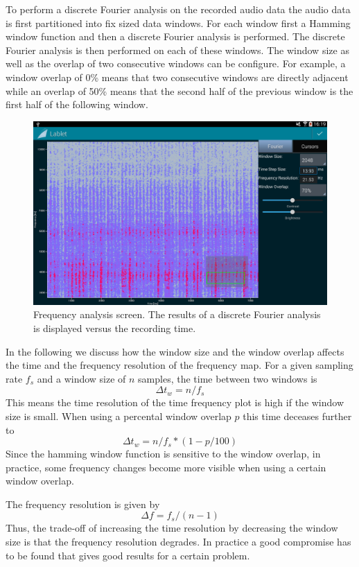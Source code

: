 \documentclass{sigchi}
\begin{document}
To perform a discrete Fourier analysis on the recorded audio data the audio data is first partitioned into fix sized data windows.
For each window first a Hamming window function and then a discrete Fourier analysis is performed.
The discrete Fourier analysis is then performed on each of these windows.
The window size as well as the overlap of two consecutive windows can be configure.
For example, a window overlap of 0\% means that two consecutive windows are directly adjacent while an overlap of 50\% means that the second half of the previous window is the first half of the following window.

\begin{figure}
  \centering
  \includegraphics[width=.99\columnwidth]{FrequencyAnalysis}
  \caption{Frequency analysis screen.
  The results of a discrete Fourier analysis is displayed versus the recording time.\label{fig:FrequencyAnalysis}}
\end{figure}

In the following we discuss how the window size and the window overlap affects the time and the frequency resolution of the frequency map. 
For a given sampling rate $f_s$ and a window size of $n$ samples, the time between two windows is
\[
\Delta t_w = n / f_s
\]
This means the time resolution of the time frequency plot is high if the window size is small.
When using a percental window overlap $p$ this time deceases further to
\[
\Delta t_w = n / f_s * (1 - p / 100)
\]
Since the hamming window function is sensitive to the window overlap, in practice, some frequency changes become more visible when using a certain window overlap.

The frequency resolution is given by
\[
\Delta f = f_s / (n - 1)
\]
Thus, the trade-off of increasing the time resolution by decreasing the window size is that the frequency resolution degrades.
In practice a good compromise has to be found that gives good results for a certain problem.
\end{document}
